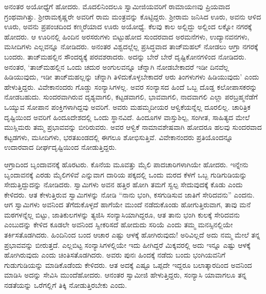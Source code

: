  ಅನಂತರ ಅಯೋಧ್ಯೆಗೆ ಹೋದರು. ಮೊದಲಿನಿಂದಲೂ ಸ್ವಾಮೀಜಿಯವರಿಗೆ ರಾಮಾಯಣವು ಪ್ರಿಯವಾದ ಗ್ರಂಥವಾಗಿತ್ತು. ಶ‍್ರೀರಾಮಕೃಷ್ಣರೇ ಅವರಿಗೆ ರಾಮ ಮಂತ್ರವನ್ನು ಕೊಟ್ಟಿದ್ದರು. ಶ‍್ರೀರಾಮ ಜನಿಸಿದ ಊರು, ಅವನು ಆಳಿದ ಊರು, ಅವನು ಪ್ರಪಂಚದಿಂದ ಕಣ್ಮರೆಯಾದ ಊರು ಅಯೋಧ್ಯೆ. ಕೆಲವು ಕಾಲ ಅಲ್ಲಿದ್ದು ಅಲ್ಲಿಂದ ಲಕ್ನೋ ನಗರಕ್ಕೆ ಹೋದರು. ಆ ಊರಿನಲ್ಲಿ ಹಿಂದಿನ ಅರಸರುಗಳು ಬಿಟ್ಟುಹೋದ ಸುಂದರವಾದ ಅರಮನೆಗಳು, ಉದ್ಯಾನವನಗಳು, ಮಸೀದಿಗಳು ಎಲ್ಲವನ್ನೂ ನೋಡಿದರು. ಅನಂತರ ವಿಶ್ವದಲ್ಲೆಲ್ಲ ಪ್ರಸಿದ್ಧವಾದ ತಾಜ್‍ಮಹಲ್ ನೋಡಲು ಆಗ್ರಾ ನಗರಕ್ಕೆ ಬಂದರು. ತಾಜ್‍ಮಹಲ್ಲಿನ ಸೌಂದರ‍್ಯಕ್ಕೆ ಪರವಶರಾದರು. ಅದನ್ನು ಬೇರೆ ಬೇರೆ ದೃಷ್ಟಿಕೋನಗಳಿಂದ ನೋಡಿದರು. ಅನಂತರ, ‘ತಾಜ್‍ಮಹಲ್ಲಿನ ಒಂದು ಚದುರ ಅಂಗುಲವನ್ನೂ ಚೆನ್ನಾಗಿ ನೋಡಬೇಕಾದರೆ ಇಡೀ ದಿನವೆಲ್ಲ ಹಿಡಿಯುವುದು, ಇಡೀ ತಾಜ್‍ಮಹಲ್ಲನ್ನು ಚೆನ್ನಾಗಿ ತಿಳಿದುಕೊಳ್ಳಬೇಕಾದರೆ ಆರು ತಿಂಗಳುಗಳು ಹಿಡಿಯುವುದು’ ಎಂದು ಹೇಳುತ್ತಿದ್ದರು. ವಿವೇಕಾನಂದರು ಗೊಡ್ಡು ಸಂನ್ಯಾಸಿಗಳಲ್ಲ. ಅವರ ಸಂನ್ಯಾಸದ ಹಿಂದೆ ಒಬ್ಬ ದೊಡ್ಡ ಕಲೋಪಾಸಕರನ್ನು ನೋಡಬಹುದು. ಸುಂದರವಾಗಿರುವ ದೃಶ್ಯವಾಗಲಿ, ಕಟ್ಟಡವಾಗಲಿ, ಭಾವವಾಗಲಿ, ನಾದವಾಗಲಿ ಎಲ್ಲಾ ಪರಬ್ರಹ್ಮನೆಡೆಗೆ ಒಯ್ಯುವ ಸೋಪಾನ ಪಂಕ್ತಿಗಳಾಗಿದ್ದವು ಅವರಿಗೆ. ಅವರು ಮಹಮ್ಮದೀಯರ ಆಳ್ವಿಕೆಯನ್ನೆಲ್ಲ ದೂರಲಿಲ್ಲ. ಚಾರಿತ್ರಿಕ ದೃಷ್ಟಿಯಿಂದ ಅವರಿಗೆ ಹಿಂದೂದೇಶದಲ್ಲಿ ಒಂದು ಸ್ಥಾನವಿದೆ. ಹಿಂದೂಗಳ ವಾಸ್ತುಶಿಲ್ಪ, ಸಂಗೀತ, ಸಾಹಿತ್ಯದ ಮೇಲೆ ಮುಸ್ಲಿಮರು ತಮ್ಮ ಪ್ರಭಾವವನ್ನು ಬೀರಿರುವರು. ಅವರ ಆಳ್ವಿಕೆ ನಾಮಾವಶೇಷವಾಗಿ ಹೋದರೂ ಹಲವು ಸುಂದರವಾದ ಕಟ್ಟಡಗಳು, ಮಸೀದಿಗಳು, ಭರತಖಂಡದಲ್ಲಿ ಈಗಲೂ ಶೋಭಿಸುತ್ತಿವೆ. ವಿವೇಕಾನಂದರು ಪ್ರತಿಯೊಂದನ್ನೂ ಉದಾರವಾದ ದೀರ್ಘದೃಷ್ಟಿಯಿಂದ ನೋಡುತ್ತಿದ್ದರು. 

 ಆಗ್ರಾದಿಂದ ಬೃಂದಾವನಕ್ಕೆ ಹೊರಟರು. ಕೊನೆಯ ಮೂವತ್ತು ಮೈಲಿ ಪಾದಚಾರಿಗಳಾಗಿಯೇ ಹೋದರು. ಇನ್ನೇನು ಬೃಂದಾವನಕ್ಕೆ ಎರಡು ಮೈಲಿಗಳಿವೆ ಎನ್ನುವಾಗ ದಾರಿಯ ಪಕ್ಕದಲ್ಲಿ ಒಂದು ಮರದ ಕೆಳಗೆ ಒಬ್ಬ ಗುಡಿಗುಡಿಯನ್ನು ಸೇದುತ್ತಿದ್ದುದನ್ನು ನೋಡಿದರು. ಸ್ವಾಮಿಗಳು ಅವನ ಹತ್ತಿರ ಹೋಗಿ ತಮಗೆ ಸ್ವಲ್ಪ ಸೇದುವುದಕ್ಕೆ ಕೊಡು ಎಂದು ಕೇಳಿದರು. ಆತ ಕೇಳುತ್ತಿರುವ ಸ್ವಾಮಿಗಳನ್ನು ನೋಡಿ “ನಾನು ಭಂಗಿ, ಕಸಗುಡಿಸುವ ಜಾತಿಗೆ ಸೇರಿದವನು” ಎಂದನು. ಆಗ ಸ್ವಾಮಿಗಳು ಅವನಿಂದ ತೆಗೆದುಕೊಳ್ಳದೆ ಹಾಗೆಯೇ ಮುಂದೆ ನಡೆದುಕೊಂಡು ಹೋಗುತ್ತಿರುವಾಗ, ತಾವು ಮನೆ ಮಠಗಳನ್ನೆಲ್ಲ ಬಿಟ್ಟು, ಜಾತಿಕುಲಗಳನ್ನು ತ್ಯಜಿಸಿ ಸಂನ್ಯಾಸಿಯಾಗಿದ್ದರೂ, ಆತ ತಾನು ಭಂಗಿ ಕುಲಕ್ಕೆ ಸೇರಿದವನು ಎಂಬುದನ್ನು ಕೇಳಿದ ಕೂಡಲೇ ಅವನಿಂದ ಸ್ವೀಕರಿಸದೆ ಹೋದುದು ಸರಿಯೆ ಎಂದು ತಮ್ಮ ಮನಸ್ಸಿನಲ್ಲಿಯೇ ತರ್ಕಿಸತೊಡಗಿದರು. ಹಿಂದಿನಿಂದ ಬಂದ ಆಚಾರ ಎಷ್ಟು ಆಳಕ್ಕೆ ಹೋಗಿರುವುದು! ಅರಿವಿಲ್ಲದೆ ಅದು ನಮ್ಮ ಮೇಲೆ ತನ್ನ ಪ್ರಭಾವವನ್ನು ಬೀರುತ್ತದೆ. ಎಲ್ಲಬಿಟ್ಟ ಸಂನ್ಯಾಸಿಗಳಲ್ಲಿಯೇ ಇದು ಹೀಗಿದ್ದರೆ ಮಿಕ್ಕವರಲ್ಲಿ ಅದು ಇನ್ನೂ ಎಷ್ಟು ಆಳಕ್ಕೆ ಹೋಗಿರುವುದು ಎಂದು ಚಿಂತಿಸತೊಡಗಿದರು. ಅವರು ಪುನಃ ಹಿಂದಕ್ಕೆ ನಡೆದು ಬಂದು ಭಂಗಿಯವನಿಗೆ ಗುಡುಗುಡಿಯನ್ನು ಮಾಡಿಕೊಡೆಂದು ಕೇಳಿದರು. ಆತ ಅದಕ್ಕೆ ಎಷ್ಟೂ ಒಪ್ಪದೇ ಇದ್ದರೂ ಬಲಾತ್ಕಾರದಿಂದ ಅವನಿಂದ ಮಾಡಿಸಿ ಅದನ್ನು ಸೇವಿಸಿ ಮುಂದೆಹೋದರು. ಆನಂತರ ಸ್ವಾಮೀಜಿ ಹೇಳುತ್ತಿದ್ದರು, ಸಂನ್ಯಾಸಿ ಯಾವಾಗಲೂ ತನ್ನ ನಡತೆಯನ್ನು ಒರೆಗಲ್ಲಿಗೆ ತಿಕ್ಕಿ ನೋಡುತ್ತಿರಬೇಕು ಎಂದು.

